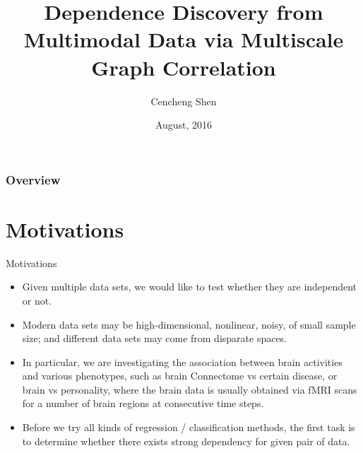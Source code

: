 \documentclass{beamer}
\title[JSM2016]{Dependence Discovery from Multimodal Data via Multiscale Graph Correlation}
\author{Cencheng Shen} %
\institute[Temple University] %
{
\textit{Joint Work with Joshua T. Vogelstein \& Mauro Maggioni \& Carey E. Priebe} \\
}
\date{August, 2016} %
\begin{document}
\begin{frame}
\titlepage %
\end{frame}

\begin{frame}
\frametitle{Overview} %
\tableofcontents %
\end{frame}

\section{Motivations}
\begin{frame}{Motivations}
\begin{itemize}[<+->]
\item Given multiple data sets, we would like to test whether they are independent or not.
\item Modern data sets may be high-dimensional, nonlinear, noisy, of small sample size; and different data sets may come from disparate spaces.
\item In particular, we are investigating the association between brain activities and various phenotypes, such as brain Connectome vs certain disease, or brain vs personality, where the brain data is usually obtained via fMRI scans for a number of brain regions at consecutive time steps.
\item Before we try all kinds of regression / classification methods, the first task is to determine whether there exists strong dependency for given pair of data.
\end{itemize}
\end{frame}
\end{document}
